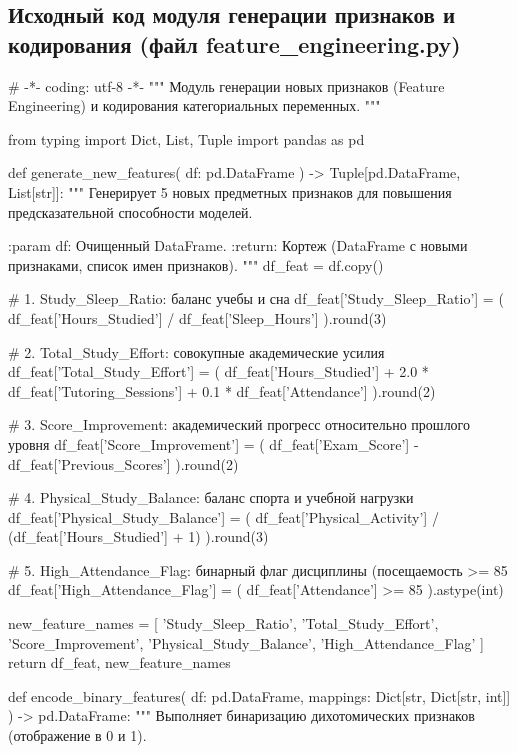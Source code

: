 \documentclass[14pt,a4paper]{extarticle}
\begin{document}
\subsection{Исходный код модуля генерации признаков и кодирования (файл feature\_engineering.py)}
\begin{CodeListing}
# -*- coding: utf-8 -*-
"""
Модуль генерации новых признаков (Feature Engineering)
и кодирования категориальных переменных.
"""

from typing import Dict, List, Tuple
import pandas as pd


def generate_new_features(
    df: pd.DataFrame
) -> Tuple[pd.DataFrame, List[str]]:
    """
    Генерирует 5 новых предметных признаков для повышения
    предсказательной способности моделей.

    :param df: Очищенный DataFrame.
    :return: Кортеж (DataFrame с новыми признаками, список имен признаков).
    """
    df_feat = df.copy()

    # 1. Study_Sleep_Ratio: баланс учебы и сна
    df_feat['Study_Sleep_Ratio'] = (
        df_feat['Hours_Studied'] / df_feat['Sleep_Hours']
    ).round(3)

    # 2. Total_Study_Effort: совокупные академические усилия
    df_feat['Total_Study_Effort'] = (
        df_feat['Hours_Studied']
        + 2.0 * df_feat['Tutoring_Sessions']
        + 0.1 * df_feat['Attendance']
    ).round(2)

    # 3. Score_Improvement: академический прогресс относительно прошлого уровня
    df_feat['Score_Improvement'] = (
        df_feat['Exam_Score'] - df_feat['Previous_Scores']
    ).round(2)

    # 4. Physical_Study_Balance: баланс спорта и учебной нагрузки
    df_feat['Physical_Study_Balance'] = (
        df_feat['Physical_Activity'] / (df_feat['Hours_Studied'] + 1)
    ).round(3)

    # 5. High_Attendance_Flag: бинарный флаг дисциплины (посещаемость >= 85%
    df_feat['High_Attendance_Flag'] = (
        df_feat['Attendance'] >= 85
    ).astype(int)

    new_feature_names = [
        'Study_Sleep_Ratio',
        'Total_Study_Effort',
        'Score_Improvement',
        'Physical_Study_Balance',
        'High_Attendance_Flag'
    ]
    return df_feat, new_feature_names


def encode_binary_features(
    df: pd.DataFrame,
    mappings: Dict[str, Dict[str, int]]
) -> pd.DataFrame:
    """
    Выполняет бинаризацию дихотомических признаков (отображение в 0 и 1).


\end{CodeListing}
\end{document}
